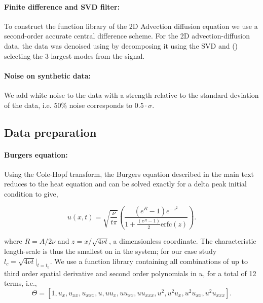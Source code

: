 \documentclass{article} %
\begin{document}
\paragraph{Finite difference and SVD filter:} To construct the function library of the 2D Advection diffusion equation we use a second-order accurate central difference scheme. For the 2D advection-diffusion data, the data was denoised using by decomposing it using the SVD and (\cite{harris_array_2020}) selecting the 3 largest modes from the signal.

\paragraph{Noise on synthetic data:} We add white noise to the data with a strength relative to the standard deviation of the data, i.e. $50\%$ noise corresponds to $0.5 \cdot \sigma$.

\subsection{Data preparation}

\paragraph{Burgers equation:} Using the Cole-Hopf transform, the Burgers equation described in the main text reduces to the heat equation and can be solved exactly for a delta peak initial condition to give, 

\begin{equation}
    u(x, t) = \sqrt{\frac{\nu}{t\pi}}\left(\frac{(e^{R}-1)e^{-z^2}}{1 + \frac{\left(e^{R}-1\right)}{2}\text{erfc}(z)}\right).
    \label{eq:burgers_dimless}
\end{equation}

where $R = A / 2 \nu$ and $z = x / \sqrt{4\nu t}$, a dimensionless coordinate. The characteristic length-scale is thus the smallest on in the system; for our case study $l_c = \sqrt{ 4 \nu t}|_{t=t_0}$. We use a function library containing all combinations of up to third order spatial derivative and second order polynomials in $u$, for a total of 12 terms, i.e.,
\begin{equation}
   \Theta = \left[1,u_x,u_{xx},u_{xxx}, u, uu_x, uu_{xx}, uu_{xxx},u^2,u^2u_x, u^2u_{xx}, u^2u_{xxx}\right].
\end{equation}
\end{document}
